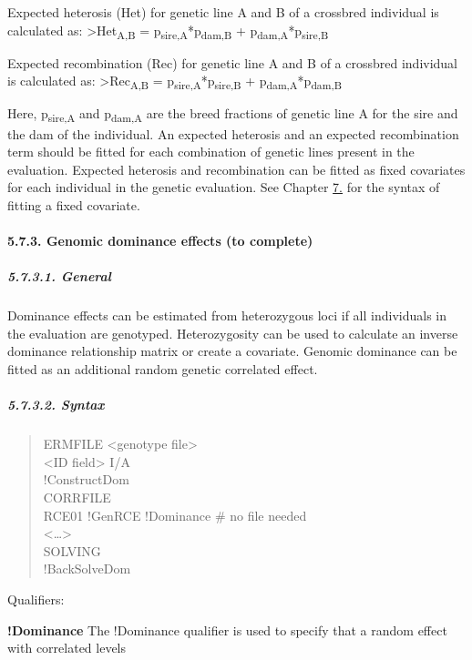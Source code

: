 Expected heterosis (Het) for genetic line A and B of a crossbred
individual is calculated as: \textgreater Het\textsubscript{A,B} =
p\textsubscript{sire,A}*p\textsubscript{dam,B} +
p\textsubscript{dam,A}*p\textsubscript{sire,B}

Expected recombination (Rec) for genetic line A and B of a crossbred
individual is calculated as: \textgreater Rec\textsubscript{A,B} =
p\textsubscript{sire,A}*p\textsubscript{sire,B} +
p\textsubscript{dam,A}*p\textsubscript{dam,B}

Here, p\textsubscript{sire,A} and p\textsubscript{dam,A} are the breed
fractions of genetic line A for the sire and the dam of the individual.
An expected heterosis and an expected recombination term should be
fitted for each combination of genetic lines present in the evaluation.
Expected heterosis and recombination can be fitted as fixed covariates
for each individual in the genetic evaluation. See Chapter
\hyperref[Stat01]{7.} for the syntax of fitting a fixed covariate.

\paragraph{5.7.3. Genomic dominance effects (to complete)}\label{Gene66}

\subparagraph{5.7.3.1. General}\label{Gene67}

Dominance effects can be estimated from heterozygous loci if all
individuals in the evaluation are genotyped. Heterozygosity can be used
to calculate an inverse dominance relationship matrix or create a
covariate. Genomic dominance can be fitted as an additional random
genetic correlated effect.

\subparagraph{5.7.3.2. Syntax}\label{Gene68}

\begin{quote}
ERMFILE \textless genotype file\textgreater{}\\
\textless ID field\textgreater{} I/A\\
!ConstructDom\\
CORRFILE\\
RCE01 !GenRCE !Dominance \# no file needed\\
\textless\ldots\textgreater{}\\
SOLVING\\
!BackSolveDom
\end{quote}

Qualifiers:

\textbf{!Dominance} The !Dominance qualifier is used to specify that a
random effect with correlated levels

